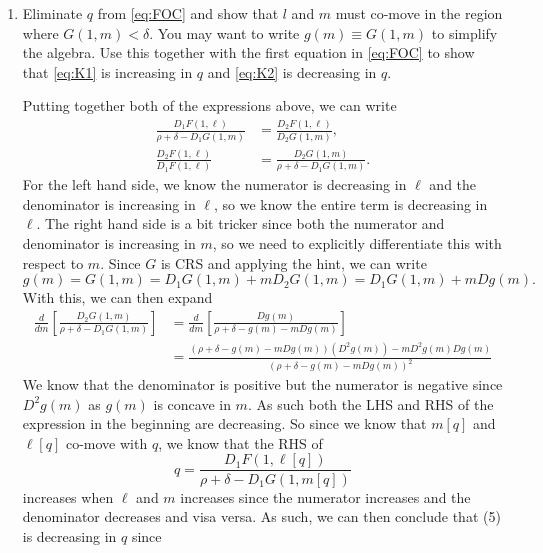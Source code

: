 \documentclass[11pt,english]{article}
\begin{document}
\begin{enumerate}
    \item[\textbf{c.}] Eliminate $q$ from \eqref{eq:FOC} and show that $l$ and
        $m$ must co-move in the region where $G(1,m) < \delta$. You may want
        to write $g(m) \equiv G(1,m)$ to simplify the algebra. Use this
        together with the first equation in \eqref{eq:FOC} to show that
        \eqref{eq:K1} is increasing in $q$ and \eqref{eq:K2} is decreasing in
        $q$.
    \begin{solution}
 	Putting together both of the expressions above, we can write
\begin{align*}
\frac{D_1F(1, \ell)}{\rho + \delta - D_1G(1, m)} &= \frac{D_2 F(1, \ell)}{D_2 G(1, m)},\\
\frac{D_2F(1, \ell)}{D_1 F(1, \ell)} &= \frac{D_2 G(1, m)}{\rho + \delta - D_1G(1, m)}.
\end{align*}For the left hand side, we know the numerator is decreasing in $\ell$ and the denominator is increasing in $\ell$, so we know the entire term is decreasing in $\ell$. The right hand side is a bit tricker since both the numerator and denominator is increasing in $m$, so we need to explicitly differentiate this with respect to $m$. Since $G$ is CRS and applying the hint, we can write $$g(m) =  G(1, m) = D_1G(1, m) + mD_2 G(1, m) = D_1G(1, m) + mDg(m).$$ With this, we can then expand
\begin{align*}
\frac{d}{dm}\left[\frac{D_2 G(1, m)}{\rho + \delta - D_1G(1, m)} \right]&= \frac{d}{dm}\left[\frac{Dg(m)}{\rho + \delta - g(m) - m Dg(m)} \right]\\
&= \frac{(\rho + \delta - g(m) - m Dg(m))(D^2g(m)) - mD^2g(m)Dg(m) }{(\rho + \delta - g(m) - m Dg(m))^2}
\end{align*}We know that the denominator is positive but the numerator is negative since $D^2g(m)$ as $g(m)$ is concave in $m$. As such both the LHS and RHS of the expression in the beginning are decreasing. So since we know that $m[q]$ and $\ell[q]$ co-move with $q$, we know that the RHS of $$q = \frac{D_1F(1, \ell[q])}{\rho + \delta - D_1G(1, m[q])}$$ increases when $\ell$ and $m$ increases since the numerator increases and the denominator decreases and visa versa. As such, we can then conclude that (5) is decreasing in $q$ since 
    \end{solution}
\end{enumerate} 
\end{document}
